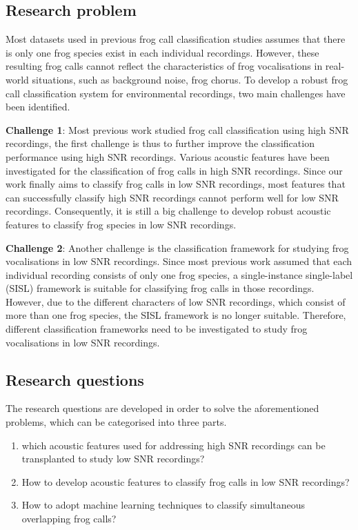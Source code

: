 \subsection{Research problem}
Most datasets used in previous frog call classification studies assumes that there is only one frog species exist in each individual recordings. However, these resulting frog calls cannot reflect the characteristics of frog vocalisations in real-world situations, such as background noise, frog chorus. To develop a robust frog call classification system for environmental recordings, two main challenges have been identified. 


\noindent \textbf{Challenge 1}: Most previous work studied frog call classification using high SNR recordings, the first challenge is thus to further improve the classification performance using high SNR recordings. Various acoustic features have been investigated for the classification of frog calls in high SNR recordings. Since our work finally aims to classify frog calls in low SNR recordings, most features that can successfully classify high SNR recordings cannot perform well for low SNR recordings. Consequently, it is still a big challenge to develop robust acoustic features to classify frog species in low SNR recordings. 

\noindent \textbf{Challenge 2}: Another challenge is the classification framework for studying frog vocalisations in low SNR recordings. Since most previous work assumed that each individual recording consists of only one frog species, a single-instance single-label (SISL) framework is suitable for classifying frog calls in those recordings. However, due to the different characters of low SNR recordings, which consist of more than one frog species, the SISL framework is no longer suitable. Therefore, different classification frameworks need to be investigated to study frog vocalisations in low SNR recordings.



\subsection{Research questions}
The research questions are developed in order to solve the aforementioned problems, which can be categorised into three parts. 

 \begin{enumerate}
     \item which acoustic features used for addressing high SNR recordings can be transplanted to study low SNR recordings?
     \item How to develop acoustic features to classify frog calls in low SNR recordings?
     \item How to adopt machine learning techniques to classify simultaneous overlapping frog calls?
  \end{enumerate}




